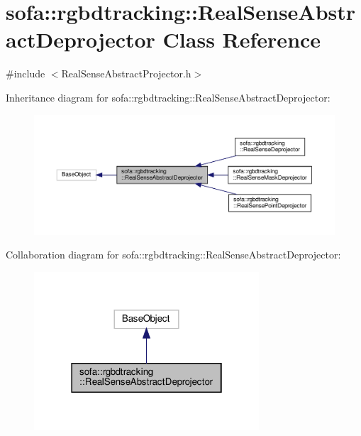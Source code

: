 \hypertarget{classsofa_1_1rgbdtracking_1_1_real_sense_abstract_deprojector}{}\section{sofa\+:\+:rgbdtracking\+:\+:Real\+Sense\+Abstract\+Deprojector Class Reference}
\label{classsofa_1_1rgbdtracking_1_1_real_sense_abstract_deprojector}


{\ttfamily \#include $<$Real\+Sense\+Abstract\+Projector.\+h$>$}



Inheritance diagram for sofa\+:\+:rgbdtracking\+:\+:Real\+Sense\+Abstract\+Deprojector\+:\nopagebreak
\begin{figure}[H]
\begin{center}
\leavevmode
\includegraphics[width=350pt]{classsofa_1_1rgbdtracking_1_1_real_sense_abstract_deprojector__inherit__graph}
\end{center}
\end{figure}


Collaboration diagram for sofa\+:\+:rgbdtracking\+:\+:Real\+Sense\+Abstract\+Deprojector\+:\nopagebreak
\begin{figure}[H]
\begin{center}
\leavevmode
\includegraphics[width=238pt]{classsofa_1_1rgbdtracking_1_1_real_sense_abstract_deprojector__coll__graph}
\end{center}
\end{figure}
